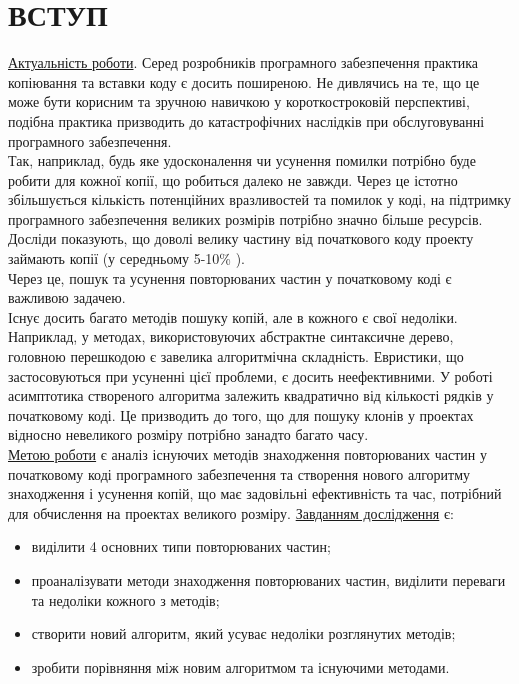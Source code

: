 \documentclass[a4paper, 14pt]{article}
\begin{document}
\section*{\textbf{ВСТУП}}
\uline{Актуальність роботи}.
Серед розробників програмного забезпечення практика копіювання та вставки коду є досить поширеною. Не дивлячись на те, що це може бути корисним та зручною навичкою у короткостроковій перспективі, подібна практика призводить до катастрофічних наслідків при обслуговуванні програмного забезпечення. \\ Так, наприклад, будь яке удосконалення чи усунення помилки потрібно буде робити для кожної копії, що робиться далеко не завжди. Через це істотно збільшується кількість потенційних вразливостей та помилок у коді, на підтримку програмного забезпечення великих розмірів потрібно значно більше ресурсів. \\
Досліди показують, що доволі велику частину від початкового коду проекту займають копії (у середньому 5-10\% \cite{Baxter98}). \\
Через це, пошук та усунення повторюваних частин у початковому коді є важливою задачею. \\
Існує досить багато методів пошуку копій, але в кожного є свої недоліки. Наприклад, у методах, використовуючих абстрактне синтаксичне дерево, головною перешкодою є завелика алгоритмічна складність. Евристики, що застосовуються при усуненні цієї проблеми, є досить неефективними. У роботі \cite{Baxter98} асимптотика створеного алгоритма залежить квадратично від кількості рядків у початковому коді. Це призводить до того, що для пошуку клонів у проектах відносно невеликого розміру потрібно занадто багато часу. \cite{Sager06} \\
\newline\uline{Метою роботи} є аналіз існуючих методів знаходження повторюваних частин у початковому коді програмного забезпечення та створення нового алгоритму знаходження і усунення копій, що має задовільні ефективність та час, потрібний для обчислення на проектах великого розміру.
\newline\uline{Завданням дослідження} є:
\begin{itemize}
	\item виділити 4 основних типи повторюваних частин;
	\item проаналізувати методи знаходження повторюваних частин, виділити переваги та недоліки кожного з методів;
	\item створити новий алгоритм, який усуває недоліки розглянутих методів;
	\item зробити порівняння між новим алгоритмом та існуючими методами.
\end{itemize}
\end{document}
